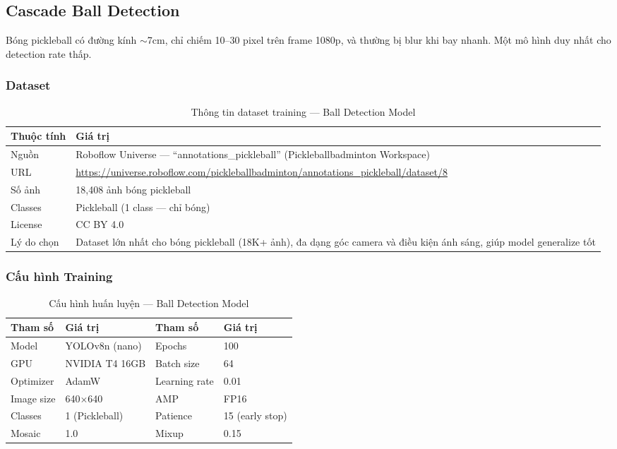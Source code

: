\documentclass[12pt,a4paper]{article}
\begin{document}
\subsection{Cascade Ball Detection}
\label{sec:cascade_ball}

Bóng pickleball có đường kính $\sim$7cm, chỉ chiếm 10--30 pixel trên frame 1080p, và thường bị blur khi bay nhanh. Một mô hình duy nhất cho detection rate thấp.

\subsubsection{Dataset}
\begin{table}[H]
\centering
\caption{Thông tin dataset training --- Ball Detection Model}
\label{tab:dataset_ball}
\begin{tabularx}{\textwidth}{l X}
\toprule
\textbf{Thuộc tính} & \textbf{Giá trị} \\
\midrule
Nguồn & Roboflow Universe --- ``annotations\_pickleball'' (Pickleballbadminton Workspace) \\
URL & \url{https://universe.roboflow.com/pickleballbadminton/annotations_pickleball/dataset/8} \\
Số ảnh & 18,408 ảnh bóng pickleball \\
Classes & Pickleball (1 class --- chỉ bóng) \\
License & CC BY 4.0 \\
Lý do chọn & Dataset lớn nhất cho bóng pickleball (18K+ ảnh), đa dạng góc camera và điều kiện ánh sáng, giúp model generalize tốt \\
\bottomrule
\end{tabularx}
\end{table}

\subsubsection{Cấu hình Training}
\begin{table}[H]
\centering
\caption{Cấu hình huấn luyện --- Ball Detection Model}
\label{tab:training_ball}
\begin{tabular}{ll|ll}
\toprule
\textbf{Tham số} & \textbf{Giá trị} & \textbf{Tham số} & \textbf{Giá trị} \\
\midrule
Model & YOLOv8n (nano) & Epochs & 100 \\
GPU & NVIDIA T4 16GB & Batch size & 64 \\
Optimizer & AdamW & Learning rate & 0.01 \\
Image size & 640$\times$640 & AMP & FP16 \\
Classes & 1 (Pickleball) & Patience & 15 (early stop) \\
Mosaic & 1.0 & Mixup & 0.15 \\
\bottomrule
\end{tabular}
\end{table}
\end{document}
